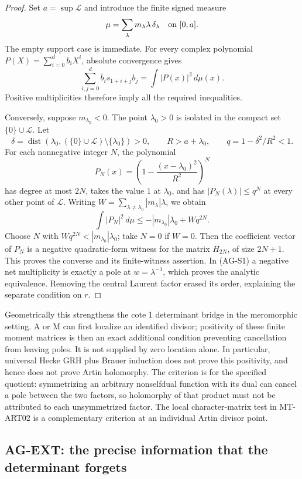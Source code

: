 \documentclass[11pt,a4paper]{article}
\begin{document}
\begin{proof}
Set $a=\sup\mathcal L$ and introduce the finite signed measure
\[
 \mu=\sum_\lambda m_\lambda\lambda\,\delta_\lambda
 \quad\hbox{on }[0,a].
\]
The empty support case is immediate. For every complex polynomial
$P(X)=\sum_{i=0}^d b_iX^i$, absolute convergence gives
\[
 \sum_{i,j=0}^d\overline b_i s_{1+i+j}b_j
       =\int |P(x)|^2\,d\mu(x).
\]
Positive multiplicities therefore imply all the required inequalities.

Conversely, suppose $m_{\lambda_0}<0$. The point $\lambda_0>0$ is
isolated in the compact set $\{0\}\cup\mathcal L$. Let
\[
 \delta=\operatorname{dist}
   (\lambda_0,(\{0\}\cup\mathcal L)\setminus\{\lambda_0\})>0,
 \qquad R>a+\lambda_0,
 \qquad q=1-\delta^2/R^2<1.
\]
For each nonnegative integer $N$, the polynomial
\[
 P_N(x)=\left(1-\frac{(x-\lambda_0)^2}{R^2}\right)^N
\]
has degree at most $2N$, takes the value $1$ at $\lambda_0$, and has
$|P_N(\lambda)|\le q^N$ at every other point of $\mathcal L$.
Writing $W=\sum_{\lambda\ne\lambda_0}|m_\lambda|\lambda$, we obtain
\[
 \int |P_N|^2\,d\mu
   \le -|m_{\lambda_0}|\lambda_0+Wq^{2N}.
\]
Choose $N$ with $Wq^{2N}<|m_{\lambda_0}|\lambda_0$; take $N=0$
if $W=0$. Then the coefficient vector of $P_N$ is a negative
quadratic-form witness for the matrix $H_{2N}$, of size $2N+1$.
This proves the converse and its finite-witness assertion. In (AG-S1)
a negative net multiplicity is exactly a pole at $w=\lambda^{-1}$,
which proves the analytic equivalence. Removing the central Laurent
factor erased its order, explaining the separate condition on $r$.
\end{proof}

Geometrically this strengthens the cote 1 determinant bridge in the
meromorphic setting. A or M can first localize an identified divisor;
positivity of these finite moment matrices is then an exact additional
condition preventing cancellation from leaving poles. It is not supplied
by zero location alone. In particular, universal Hecke GRH plus Brauer
induction does not prove this positivity, and hence does not prove Artin
holomorphy. The criterion is for the specified quotient: symmetrizing
an arbitrary nonselfdual function with its dual can cancel a pole between
the two factors, so holomorphy of that product must not be attributed to
each unsymmetrized factor. The local character-matrix test in MT-ART02
is a complementary criterion at an individual Artin divisor point.

\subsection{AG-EXT: the precise information that the determinant forgets}
\label{ag:ext}
\end{document}
